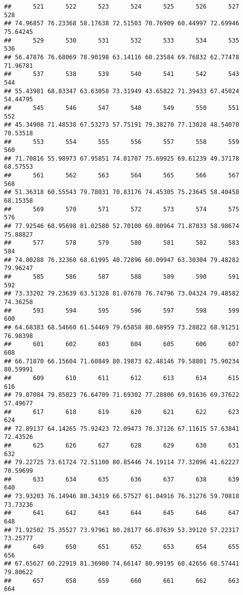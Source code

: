 \documentclass[
]{article}
\begin{document}
\begin{verbatim}
##      521      522      523      524      525      526      527      528 
## 74.96857 76.23368 58.17638 72.51503 70.76909 60.44997 72.69946 75.64245 
##      529      530      531      532      533      534      535      536 
## 56.47876 76.68069 78.90198 63.14116 60.23584 69.76832 62.77478 71.96781 
##      537      538      539      540      541      542      543      544 
## 55.43981 68.83347 63.63058 73.31949 43.65822 71.39433 67.45024 54.44795 
##      545      546      547      548      549      550      551      552 
## 45.34908 71.48538 67.53273 57.75191 79.38270 77.13028 48.54070 70.53518 
##      553      554      555      556      557      558      559      560 
## 71.70816 55.98973 67.95851 74.01707 75.69925 69.61239 49.37178 68.57553 
##      561      562      563      564      565      566      567      568 
## 51.36318 60.55543 79.78031 70.83176 74.45305 75.23645 58.40458 68.15358 
##      569      570      571      572      573      574      575      576 
## 77.92546 68.95698 81.02580 52.70100 69.80964 71.87033 58.98674 75.88827 
##      577      578      579      580      581      582      583      584 
## 74.00288 76.32360 68.61995 40.72896 60.09947 63.30304 79.48282 79.96247 
##      585      586      587      588      589      590      591      592 
## 73.33202 79.23639 63.51328 81.07678 76.74796 73.04324 79.48582 74.36258 
##      593      594      595      596      597      598      599      600 
## 64.68383 68.54660 61.54469 79.65858 80.68959 73.28822 68.91251 76.98398 
##      601      602      603      604      605      606      607      608 
## 66.71870 66.15604 71.60849 80.19873 62.48146 79.58801 75.90234 80.59991 
##      609      610      611      612      613      614      615      616 
## 79.07084 79.85023 76.64709 71.69302 77.28806 69.91636 69.37622 57.49677 
##      617      618      619      620      621      622      623      624 
## 72.89137 64.14265 75.92423 72.09473 70.37126 67.11615 57.63841 72.43526 
##      625      626      627      628      629      630      631      632 
## 79.22725 73.61724 72.51100 80.85446 74.19114 77.32096 41.62227 70.59699 
##      633      634      635      636      637      638      639      640 
## 73.93203 76.14946 80.34319 66.57527 61.04916 76.31276 59.70818 73.73236 
##      641      642      643      644      645      646      647      648 
## 71.92502 75.35527 73.97961 80.28177 66.07639 53.39120 57.22317 73.25777 
##      649      650      651      652      653      654      655      656 
## 67.65627 60.22919 81.36980 74.66147 80.99195 60.42656 68.57441 79.80622 
##      657      658      659      660      661      662      663      664 

\end{verbatim}
\end{document}
